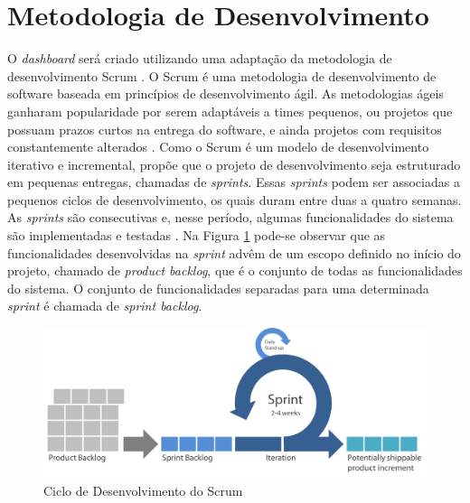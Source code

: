 \section{Metodologia de Desenvolvimento}
\label{met_desenvolvimento}
O \textit{dashboard} será criado utilizando uma adaptação da metodologia de desenvolvimento Scrum \cite{pagotto_scrum_2016}. O Scrum é uma metodologia de desenvolvimento de software baseada em princípios de desenvolvimento ágil. As metodologias ágeis ganharam popularidade por serem adaptáveis a 	times pequenos, ou projetos que possuam prazos curtos na entrega do software, e ainda projetos com requisitos constantemente alterados \cite{lopez-martinez_problems_2016}. Como o Scrum é um modelo de desenvolvimento iterativo e incremental, propõe que o projeto de desenvolvimento seja estruturado em pequenas entregas, chamadas de \textit{sprints}. Essas \textit{sprints} podem ser associadas a pequenos ciclos de desenvolvimento, os quais duram entre duas a quatro semanas. As \textit{sprints} são consecutivas e, nesse período, algumas funcionalidades do sistema são implementadas e testadas \cite{pagotto_scrum_2016}. Na Figura \ref{img:scrum} pode-se observar que as funcionalidades desenvolvidas na \textit{sprint} advêm de um escopo definido no início do projeto,  chamado de \textit{product backlog}, que é o conjunto de todas as funcionalidades do sistema. O conjunto de funcionalidades separadas para uma determinada \textit{sprint} é chamada de \textit{sprint backlog}\cite{sabbagh_scrum:_2014}.
\graphicspath{{figuras/}}
\begin{figure}[H]
\centering
\includegraphics[scale=0.40]{scrum}
\caption{Ciclo de Desenvolvimento do Scrum}
\label{img:scrum}
\end{figure}

